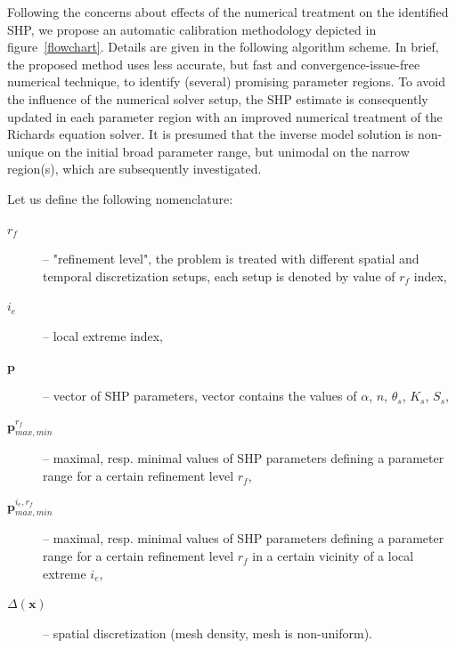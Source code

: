 \documentclass[review,times,3p,10pt]{elsarticle}
\renewcommand{\vec}{\mathbf}
\begin{document}
Following the concerns about effects of the numerical treatment on the identified SHP, we propose an automatic calibration methodology depicted in figure~\ref{flowchart}. Details are given in the following algorithm scheme. In brief, the proposed method uses less accurate, but fast and convergence-issue-free numerical technique, to identify (several) promising parameter regions. To avoid the influence of the numerical solver setup,  the SHP estimate is consequently updated in each parameter region with an improved numerical treatment of the Richards equation solver. It is presumed that the inverse model solution is non-unique on the initial broad parameter range, but unimodal on the narrow region(s), which are subsequently investigated. 

Let us define the following nomenclature: %

\hrulefill
\begin{description}
\item[$r_f$] -- "refinement level", the problem is treated with different spatial and temporal discretization setups, each setup is denoted by value of $r_f$ index,
\item[$i_e$] -- local extreme index,
\item[$\vec{p}$] -- vector of SHP parameters, vector contains the values of $\alpha$, $n$, $\theta_s$, $K_s$, $S_s$,
\item[$\vec{p}_{max,min}^{r_f}$] -- maximal, resp. minimal values of SHP parameters defining a parameter range for a certain refinement level $r_f$,
\item[$\vec{p}_{max,min}^{ i_e, r_f}$] -- maximal, resp. minimal values of SHP parameters defining a parameter range for a certain refinement level $r_f$ in a certain vicinity of a local extreme $i_e$,
\item[$\Delta(\vec{x})$] -- spatial discretization (mesh density, mesh is non-uniform).
\end{description}
\hrulefill
\end{document}
